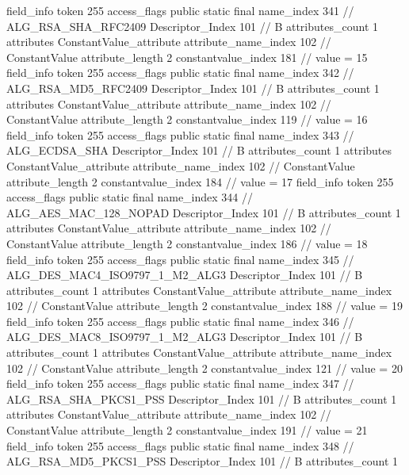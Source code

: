 {{{{{{{				}
				}
			}
			field_info {
				token	255
				access_flags	public static final
				name_index	341		// ALG_RSA_SHA_RFC2409
				Descriptor_Index	101		// B
				attributes_count	1
				attributes {
				ConstantValue_attribute {
					attribute_name_index	102		// ConstantValue
					attribute_length	2
					constantvalue_index	181		// value = 15
				}
				}
			}
			field_info {
				token	255
				access_flags	public static final
				name_index	342		// ALG_RSA_MD5_RFC2409
				Descriptor_Index	101		// B
				attributes_count	1
				attributes {
				ConstantValue_attribute {
					attribute_name_index	102		// ConstantValue
					attribute_length	2
					constantvalue_index	119		// value = 16
				}
				}
			}
			field_info {
				token	255
				access_flags	public static final
				name_index	343		// ALG_ECDSA_SHA
				Descriptor_Index	101		// B
				attributes_count	1
				attributes {
				ConstantValue_attribute {
					attribute_name_index	102		// ConstantValue
					attribute_length	2
					constantvalue_index	184		// value = 17
				}
				}
			}
			field_info {
				token	255
				access_flags	public static final
				name_index	344		// ALG_AES_MAC_128_NOPAD
				Descriptor_Index	101		// B
				attributes_count	1
				attributes {
				ConstantValue_attribute {
					attribute_name_index	102		// ConstantValue
					attribute_length	2
					constantvalue_index	186		// value = 18
				}
				}
			}
			field_info {
				token	255
				access_flags	public static final
				name_index	345		// ALG_DES_MAC4_ISO9797_1_M2_ALG3
				Descriptor_Index	101		// B
				attributes_count	1
				attributes {
				ConstantValue_attribute {
					attribute_name_index	102		// ConstantValue
					attribute_length	2
					constantvalue_index	188		// value = 19
				}
				}
			}
			field_info {
				token	255
				access_flags	public static final
				name_index	346		// ALG_DES_MAC8_ISO9797_1_M2_ALG3
				Descriptor_Index	101		// B
				attributes_count	1
				attributes {
				ConstantValue_attribute {
					attribute_name_index	102		// ConstantValue
					attribute_length	2
					constantvalue_index	121		// value = 20
				}
				}
			}
			field_info {
				token	255
				access_flags	public static final
				name_index	347		// ALG_RSA_SHA_PKCS1_PSS
				Descriptor_Index	101		// B
				attributes_count	1
				attributes {
				ConstantValue_attribute {
					attribute_name_index	102		// ConstantValue
					attribute_length	2
					constantvalue_index	191		// value = 21
				}
				}
			}
			field_info {
				token	255
				access_flags	public static final
				name_index	348		// ALG_RSA_MD5_PKCS1_PSS
				Descriptor_Index	101		// B
				attributes_count	1
}}}}}
